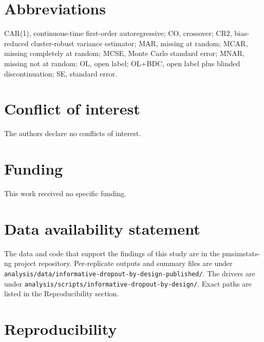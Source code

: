 \documentclass[
  11pt,
]{article}
\begin{document}
\section*{Abbreviations}\label{abbreviations}

CAR(1), continuous-time first-order autoregressive; CO, crossover;
CR2, bias-reduced cluster-robust variance estimator; MAR, missing at
random; MCAR, missing completely at random; MCSE, Monte Carlo standard
error; MNAR, missing not at random; OL, open label; OL+BDC, open label
plus blinded discontinuation; SE, standard error.

\section*{Conflict of interest}\label{conflict-of-interest}

The authors declare no conflicts of interest.

\section*{Funding}\label{funding}

This work received no specific funding.

\section*{Data availability statement}\label{data-availability-statement}

The data and code that support the findings of this study are in the
pmsimstats-ng project repository. Per-replicate outputs and summary
files are under
\texttt{analysis/data/informative-dropout-by-design-published/}. The drivers
are under \texttt{analysis/scripts/informative-dropout-by-design/}. Exact
paths are listed in the Reproducibility section.

\section*{Reproducibility}\label{reproducibility}
\end{document}
